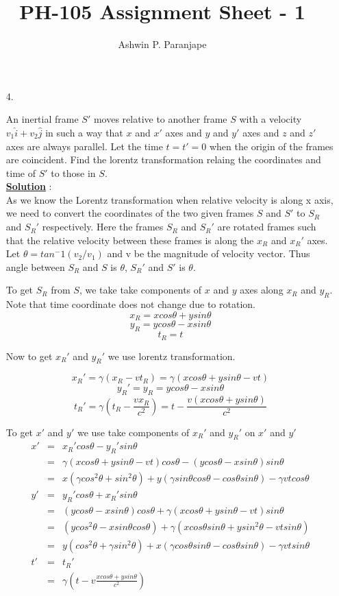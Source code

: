 \documentclass[10pt, a4paper]{article}
\begin{document}
\title{PH-105 Assignment Sheet - 1}
\author{Ashwin P. Paranjape}
\date{}
\maketitle
\begin{enumerate}
\item[4.]{An inertial frame $S'$  moves relative to another frame $S$ with a velocity $v_1 \hat{i} + v_2 \hat{j}$ in such a way that $x$ and $x'$ axes and $y$ and $y'$ axes and $z$ and $z'$ axes are always parallel. Let the time $t=t'=0$ when the origin of the frames are coincident. Find the lorentz transformation relaing the coordinates and time of $S'$ to those in $S$.\\


{\underline {\bf Solution}} : \\
As we know the Lorentz transformation when relative velocity is along x axis, we need to convert the coordinates of the two given frames $S$ and $S'$ to $S_R$ and $S_R'$ respectively. Here the frames $S_R$ and $S_R'$ are rotated frames such that the relative velocity between these frames is along the $x_R$ and $x_R'$ axes. Let $\theta = tan^-1(v_2/v_1)$ and v be the magnitude of velocity vector. Thus angle between $S_R$ and $S$ is $\theta$, $S_R'$ and $S'$ is $\theta$.

To get $S_R$ from $S$, we take take components of $x$ and $y$ axes along $x_R$ and $y_R$. Note that time coordinate does not change due to rotation.
\[x_R = x cos \theta + y sin \theta \]
\[y_R = y cos \theta - x sin \theta \]
\[t_R = t\]

Now to get $x_R'$ and $y_R'$ we use lorentz transformation.

\[x_R'=\gamma ( x_R - vt_R) = \gamma (x cos\theta + y sin\theta - v t)\]
\[y_R' = y_R = y cos \theta - xsin\theta\]
\[t_R'= \gamma (t_R - \frac{v x_R}{c^2}) = t-\frac{v (xcos\theta+ysin\theta)}{c^2}\]

To get $x'$ and $y'$ we use take components of $x_R'$ and $y_R'$ on $x'$ and $y'$
\begin{eqnarray*}
x' &=&x_R' cos \theta - y_R' sin \theta \\&= &\gamma ( x cos \theta + y sin \theta - vt)cos\theta - (ycos\theta -xsin\theta)sin\theta\\
   &= &x(\gamma cos^2 \theta +sin^2 \theta) + y (\gamma sin \theta cos \theta - cos \theta sin \theta)-\gamma v t cos \theta\\
y' &= &y_R' cos \theta + x_R' sin \theta \\
   &=& (ycos\theta - xsin\theta)cos\theta + \gamma (xcos\theta +ysin\theta -vt) sin\theta\\
   &= &(ycos^2\theta - xsin\theta cos\theta)+ \gamma (xcos\theta sin\theta +ysin^2\theta-vt sin\theta)\\
   &= &y(cos^2\theta +\gamma sin^2\theta) + x(\gamma cos\theta sin \theta-cos\theta sin \theta) - \gamma v t sin\theta\\
t' &= &t_R'\\
   &= &\gamma (t - v \frac{x cos \theta + y sin \theta}{c^2})
\end{eqnarray*}
}

\end{enumerate}
\end{document}

